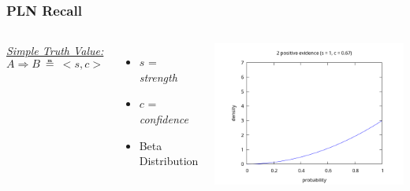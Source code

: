\documentclass[aspectratio=169]{beamer}
\newcommand{\limp}{\Rightarrow}
\newcommand{\STV}[2]{<\!#1, #2\!>}
\begin{document}
\begin{frame}
  \frametitle{PLN Recall}
  \begin{columns}
    \column{5cm}
    \underline{\emph{Simple Truth Value:}}
    $$A \limp B\ \measeq\ \STV{s}{c}$$
    \begin{itemize}
    \item $s$ = \emph{strength}
    \item $c$ = \emph{confidence}
    \item Beta Distribution
    \end{itemize}
    \column{10cm}
    \includegraphics[scale=0.4]{figs/observations_0_2.png}
  \end{columns}
\end{frame}
\end{document}
